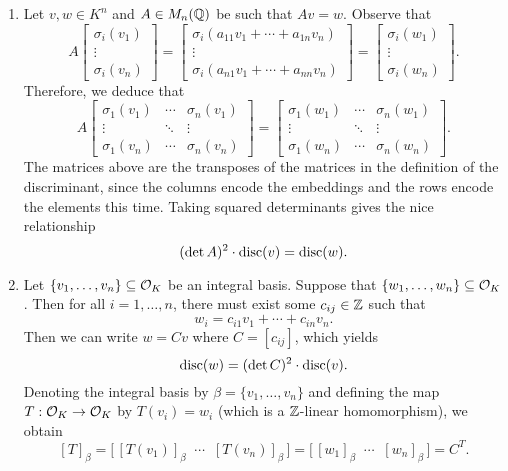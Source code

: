 \begin{enumerate}[(1)]
    \item Let $v, w \in K^n$ and $A \in M_n(\mathbb{Q})$ be such that $Av = w$. 
    Observe that 
    \[ A \begin{bmatrix} \sigma_i(v_1) \\ \vdots \\ \sigma_i(v_n) \end{bmatrix} 
    = \begin{bmatrix} \sigma_i(a_{11}v_1 + \cdots + a_{1n}v_n) \\ \vdots \\ 
        \sigma_i(a_{n1}v_1 + \cdots + a_{nn}v_n) \end{bmatrix} 
    = \begin{bmatrix} \sigma_i(w_1) \\ \vdots \\ \sigma_i(w_n) \end{bmatrix}. \] 
    Therefore, we deduce that 
    \[ A \begin{bmatrix} \sigma_1(v_1) & \cdots & \sigma_n(v_1) \\ 
        \vdots & \ddots & \vdots \\ 
        \sigma_1(v_n) & \cdots & \sigma_n(v_n) \end{bmatrix} 
    = \begin{bmatrix} \sigma_1(w_1) & \cdots & \sigma_n(w_1) \\ 
        \vdots & \ddots & \vdots \\ 
        \sigma_1(w_n) & \cdots & \sigma_n(w_n) \end{bmatrix}. \] 
    The matrices above are the transposes of the matrices in the 
    definition of the discriminant, since the columns encode the embeddings 
    and the rows encode the elements this time. Taking squared determinants 
    gives the nice relationship
    \[ (\det A)^2 \cdot \operatorname{disc}(v) = \operatorname{disc}(w). \] 

    \item Let $\{v_1, \dots, v_n\} \subseteq {\cal O}_K$ be an integral basis.
    Suppose that $\{w_1, \dots, w_n\} \subseteq {\cal O}_K$. Then 
    for all $i = 1, \dots, n$, there must exist some $c_{ij} \in \mathbb{Z}$ such that 
    \[ w_i = c_{i1} v_1 + \cdots + c_{in} v_n. \] 
    Then we can write $w = Cv$ where $C = [c_{ij}]$, which yields 
    \[ \operatorname{disc}(w) = (\det C)^2 \cdot \operatorname{disc}(v). \] 
    Denoting the integral basis by $\beta = \{v_1, \dots, v_n\}$ and defining 
    the map $T : {\cal O}_K \to {\cal O}_K$ by $T(v_i) = w_i$ (which is a 
    $\mathbb{Z}$-linear homomorphism), we obtain 
    \[ [T]_\beta 
        = \Big[\,[T(v_1)]_\beta \;\; \cdots \;\;[T(v_n)]_\beta\,\Big]
        = \Big[\,[w_1]_\beta \;\; \cdots \;\; [w_n]_\beta\,\Big]
        = C^T. \] 


\end{enumerate}
